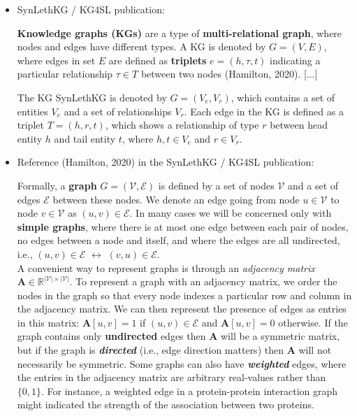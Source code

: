 \documentclass{article}
\begin{document}
\begin{itemize}

\item SynLethKG / KG4SL publication:

\begin{displayquote}
\textbf{Knowledge graphs (KGs)} are a type of \textbf{multi-relational graph}, where nodes and edges have different types. A KG is denoted by $ G = (V, E) $, where edges in set $ E $ are defined as \textbf{triplets} $ e = (h, \tau, t) $ indicating a particular relationship $ \tau \in T $ between two nodes (Hamilton, 2020).
[...]

The KG SynLethKG is denoted by $ G = (V_e, V_r)  $, which contains a set of entities $ V_e $ and a set of relationships $ V_r $. Each edge in the KG is defined as a triplet $ T = (h, r, t) $, which shows a relationship of type $ r $ between head entity $ h $ and tail entity $ t $, where $ h, t \in V_e $ and $ r \in V_r $.
\end{displayquote}

\item Reference (Hamilton, 2020) in the SynLethKG / KG4SL publication:

\begin{displayquote}
Formally, a \textbf{graph} $ G = (\mathcal{V}, \mathcal{E}) $ is defined by a set of nodes $ \mathcal{V} $ and a set of edges $ \mathcal{E} $ between these nodes. We denote an edge going from node $ u \in \mathcal{V} $ to node $ v \in \mathcal{V} $ as $ (u, v) \in \mathcal{E} $. In many cases we will be concerned only with \textbf{simple graphs}, where there is at most one edge between each pair of nodes, no edges between a node and itself, and where the edges are all undirected, i.e., $ (u, v) \in \mathcal{E} $ $\leftrightarrow$ $ (v, u) \in \mathcal{E} $.\\
A convenient way to represent graphs is through an \textit{adjacency matrix} $ \mathbf{A} \in 	\mathbb{R}^{|\mathcal{V}| \times |\mathcal{V}|} $. To represent a graph with an adjacency matrix, we order the nodes in the graph so that every node indexes a particular row and column in the adjacency matrix. We can then represent the presence of edges as entries in this matrix: $ \mathbf{A}[u, v] = 1 $ if $ (u, v) \in \mathcal{E} $ and $ \mathbf{A}[u, v] = 0 $ otherwise. If the graph contains only \textbf{undirected} edges then $ \mathbf{A} $ will be a symmetric matrix, but if the graph is \textbf{\textit{directed}} (i.e., edge direction matters) then $ \mathbf{A} $ will not necessarily be symmetric. Some graphs can also have \textbf{\textit{weighted}} edges, where the entries in the adjacency matrix are arbitrary real-values rather than $ \{0, 1\} $. For instance, a weighted edge in a protein-protein interaction graph might indicated the strength of the association between two proteins.


\end{displayquote}
\end{itemize}
\end{document}
